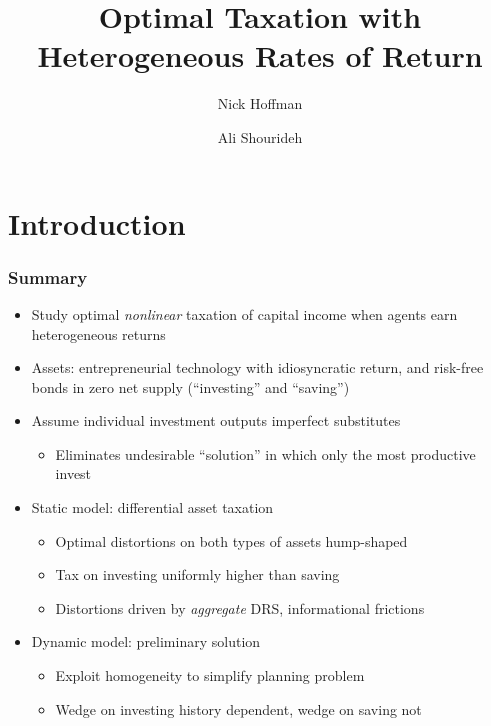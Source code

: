 \documentclass{beamer}
\begin{document}
    
\title{Optimal Taxation with Heterogeneous Rates of Return}
\author[Hoffman, Shourideh]{Nick Hoffman \and Ali Shourideh }

\begin{frame}
\titlepage 
\end{frame}

\section{Introduction}
\begin{frame}
    \frametitle{Summary}

    \begin{itemize}
        \item Study optimal \textit{nonlinear} taxation of capital income when agents earn heterogeneous returns 
        \item Assets: entrepreneurial technology with idiosyncratic return, and risk-free bonds in zero net supply (``investing'' and ``saving'')
        \item Assume individual investment outputs imperfect substitutes 
        \begin{itemize}
            \item Eliminates undesirable ``solution'' in which only the most productive invest
        \end{itemize}
        \item Static model: differential asset taxation 
        \begin{itemize}
            \item Optimal distortions on both types of assets hump-shaped 
            \item Tax on investing uniformly higher than saving 
            \item Distortions driven by \textit{aggregate} DRS, informational frictions 
        \end{itemize} 
        \item Dynamic model: preliminary solution 
        \begin{itemize}
            \item Exploit homogeneity to simplify planning problem 
            \item Wedge on investing history dependent, wedge on saving not 
        \end{itemize}
    \end{itemize}

\end{frame}
\end{document}
